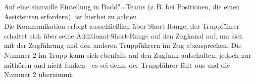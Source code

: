 Auf eine sinnvolle Einteilung in Budd"=Teams (z.\,B. bei Positionen, die einen Assistenten erfordern), ist hierbei zu achten.\\
Die Kommunikation erfolgt ausschließlich über Short-Range, der Truppführer schaltet sich über seine Additional-Short-Range auf den Zugkanal auf, um sich mit der Zugführung und den anderen Truppführern im Zug abzusprechen. Die Nummer 2 im Trupp kann sich ebenfalls auf den Zugfunk aufschalten, jedoch nur mithören und nicht funken - es sei denn, der Truppführer fällt aus und die Nummer 2 übernimmt.